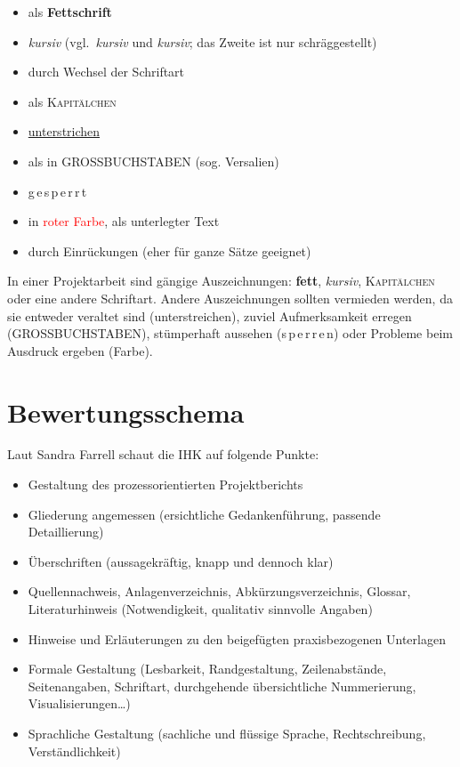 \documentclass[a4paper,titlepage=true,twoside]{scrartcl}
\begin{document}
\begin{itemize}
 \item als \textbf{Fettschrift}
 \item \textit{kursiv} (vgl.\ \textit{kursiv} und \textsl{kursiv}; 
   das Zweite ist nur schräggestellt)
 \item \textsf{durch Wechsel der Schriftart}
 \item als \textsc{Kapitälchen}
 \item \underline{unterstrichen}
 \item als in GROSSBUCHSTABEN (sog. Versalien)
 \item g\,e\,s\,p\,e\,r\,r\,t
 \item in \textcolor{red}{roter Farbe}, als \colorbox{light}{unterlegter Text}
 \item durch Einrückungen (eher für ganze Sätze geeignet)
\end{itemize}

In einer Projektarbeit sind gängige Auszeichnungen: \textbf{fett}, \textit{kursiv},
\textsc{Kapitälchen} oder eine andere \textsf{Schriftart}. Andere Auszeichnungen
sollten vermieden werden, da sie entweder veraltet sind (unterstreichen), zuviel 
Aufmerksamkeit erregen (GROSSBUCHSTABEN), stümperhaft aussehen 
(s\,p\,e\,r\,r\,e\,n) oder Probleme beim Ausdruck ergeben (Farbe).


\appendix
\section{Bewertungsschema}
Laut Sandra Farrell schaut die IHK auf folgende Punkte:

\begin{itemize}
 \item Gestaltung des prozessorientierten Projektberichts
 \item Gliederung angemessen (ersichtliche Gedankenführung, passende Detaillierung)
 \item Überschriften (aussagekräftig, knapp und dennoch klar)
 \item Quellennachweis, Anlagenverzeichnis, Abkürzungsverzeichnis, Glossar,
       Literaturhinweis (Notwendigkeit, qualitativ sinnvolle Angaben)
 \item Hinweise und Erläuterungen zu den beigefügten praxisbezogenen Unterlagen
 \item Formale Gestaltung (Lesbarkeit, Randgestaltung, Zeilenabstände, Seitenangaben,
       Schriftart, durchgehende übersichtliche Nummerierung, Visualisierungen\ldots)
 \item Sprachliche Gestaltung (sachliche und flüssige Sprache, Rechtschreibung,
       Verständlichkeit)
\end{itemize}
\end{document}
